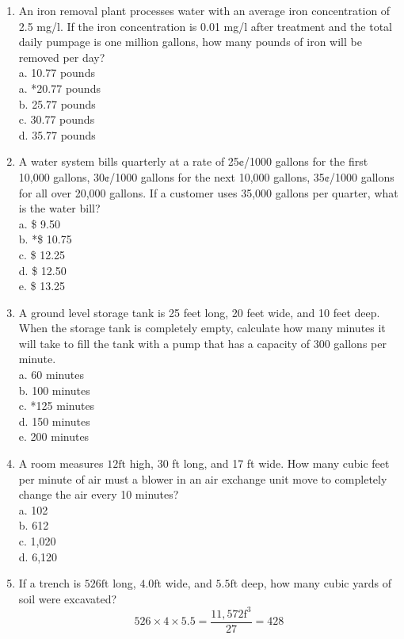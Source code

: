 \begin{enumerate}
\item An iron removal plant processes water with an average iron concentration of 2.5 mg/l. If the iron concentration is 0.01 mg/l after treatment and the total daily pumpage is one million gallons, how many pounds of iron will be removed per day?\\
a. 10.77 pounds\\
a. *20.77 pounds\\
b. 25.77 pounds\\
c. 30.77 pounds\\
d. 35.77 pounds\\
\item A water system bills quarterly at a rate of 25¢/1000 gallons for the first 10,000 gallons, 30¢/1000 gallons for the next 10,000 gallons, 35¢/1000 gallons for all over 20,000 gallons.  If a customer uses 35,000 gallons per quarter, what is the water bill?\\
a. \$ 9.50\\
b. *\$ 10.75\\
c. \$ 12.25\\
d. \$ 12.50\\
e. \$ 13.25\\

\item A ground level storage tank is 25 feet long, 20 feet wide, and 10 feet deep. When the storage tank is completely empty, calculate how many minutes it will take to fill the tank with a pump that has a capacity of 300 gallons per minute.\\
a. 60 minutes\\
b. 100 minutes\\
c. *125 minutes\\
d. 150 minutes\\
e. 200 minutes\\



\item A room measures $12 \mathrm{ft}$ high, 30 ft long, and 17 ft wide. How many cubic feet per minute of air must a blower in an air exchange unit move to completely change the air every 10 minutes?\\
a. 102\\
b. 612\\
c. 1,020\\
d. 6,120\\


\item If a trench is $526 \mathrm{ft}$ long, $4.0 \mathrm{ft}$ wide, and $5.5 \mathrm{ft}$ deep, how many cubic yards of soil were excavated?\\
$$526 \times 4 \times 5.5=\frac{11,572 \mathrm{f}^{3}}{27}=428$$\\


\end{enumerate}
